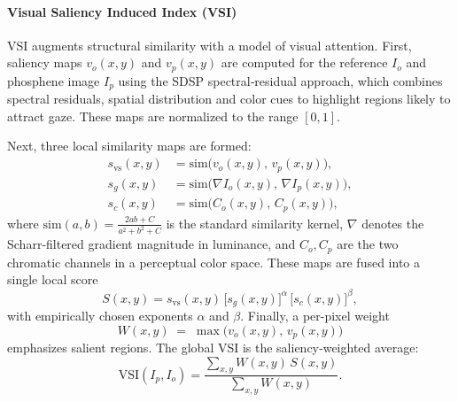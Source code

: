 \paragraph{Visual Saliency Induced Index (VSI)}  
VSI \cite{Zhang2014} augments structural similarity with a model of visual attention.  First, saliency maps \(v_o(x,y)\) and \(v_p(x,y)\) are computed for the reference \(I_o\) and phosphene image \(I_p\) using the SDSP spectral‐residual approach, which combines spectral residuals, spatial distribution and color cues to highlight regions likely to attract gaze.  These maps are normalized to the range \([0,1]\).  

Next, three local similarity maps are formed:
\begin{align*}
s_{\mathrm{vs}}(x,y)
&= \mathrm{sim}\bigl(v_o(x,y),\,v_p(x,y)\bigr),\\
s_{g}(x,y)
&= \mathrm{sim}\bigl(\nabla I_o(x,y),\,\nabla I_p(x,y)\bigr),\\
s_{c}(x,y)
&= \mathrm{sim}\bigl(C_o(x,y),\,C_p(x,y)\bigr),
\end{align*}
where \(\mathrm{sim}(a,b)=\frac{2ab + C}{a^2 + b^2 + C}\) is the standard similarity kernel, \(\nabla\) denotes the Scharr‐filtered gradient magnitude in luminance, and \(C_o,C_p\) are the two chromatic channels in a perceptual color space.  These maps are fused into a single local score
\[
S(x,y)
= s_{\mathrm{vs}}(x,y)\,\bigl[s_{g}(x,y)\bigr]^{\alpha}\,\bigl[s_{c}(x,y)\bigr]^{\beta},
\]
with empirically chosen exponents \(\alpha\) and \(\beta\).  Finally, a per-pixel weight
\[
W(x,y) \;=\;\max\!\bigl(v_o(x,y),\,v_p(x,y)\bigr)
\]
emphasizes salient regions.  The global VSI is the saliency‐weighted average:
\[
\mathrm{VSI}(I_p,I_o)
= \frac{\sum_{x,y}W(x,y)\,S(x,y)}
       {\sum_{x,y}W(x,y)}.
\]

